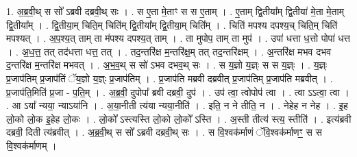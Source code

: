 \documentclass[17pt]{extarticle}
\begin{document}
1. अ॒ब्र॒वी॒थ् स सो᳚ ऽब्रवी दब्रवी॒थ् सः । . स ए॒ता मे॒ताꣳ स स ए॒ताम् । . ए॒ताम् द्वि॒तीया᳚म् द्वि॒तीया॑ मे॒ता मे॒ताम् द्वि॒तीया᳚म् । . द्वि॒तीया॒म् चिति॒म् चिति॑म् द्वि॒तीया᳚म् द्वि॒तीया॒म् चिति᳚म् । . चिति॑ मपश्य दपश्य॒च् चिति॒म् चिति॑ मपश्यत् । . अ॒प॒श्य॒त् ताम् ता म॑पश्य दपश्य॒त् ताम् । . ता मुपोप॒ ताम् ता मुप॑ । . उपा॑ धत्ता ध॒त्तो पोपा॑ धत्त । . अ॒ध॒त्त॒ तत् तद॑धत्ता धत्त॒ तत् । . तद॒न्तरि॑क्ष म॒न्तरि॑क्ष॒म् तत् तद॒न्तरि॑क्षम् । . अ॒न्तरि॑क्ष मभव दभव द॒न्तरि॑क्ष म॒न्तरि॑क्ष मभवत् । . अ॒भ॒व॒थ् स सो॑ ऽभव दभव॒थ् सः । . स य॒ज्ञो य॒ज्ञ्ः स स य॒ज्ञ्ः । . य॒ज्ञ्ः प्र॒जाप॑तिम् प्र॒जाप॑तिं ॅय॒ज्ञो य॒ज्ञ्ः प्र॒जाप॑तिम् । . प्र॒जाप॑ति मब्रवी दब्रवीत् प्र॒जाप॑तिम् प्र॒जाप॑ति मब्रवीत् । . प्र॒जाप॑ति॒मिति॑ प्र॒जा - प॒ति॒म् । . अ॒ब्र॒वी॒ दुपोपा᳚ ब्रवी दब्रवी॒ दुप॑ । . उप॑ त्वा॒ त्वोपोप॑ त्वा । . त्वा ऽऽत्वा॒ त्वा । . आ ऽया᳚ न्यया॒ न्याऽया॑नि । . अ॒या॒नीती त्य॑या न्यया॒नीति॑ । . इति॒ न ने तीति॒ न । . नेहेह न नेह । . इ॒ह लो॒को लो॒क इ॒हेह लो॒कः । . लो॒को᳚ ऽस्त्यस्ति लो॒को लो॒को᳚ ऽस्ति । . अ॒स्ती तीत्य॑ स्त्य॒ स्तीति॑ । . इत्य॑ब्रवी दब्रवी॒ दिती त्य॑ब्रवीत् । . अ॒ब्र॒वी॒थ् स सो᳚ ऽब्रवी दब्रवी॒थ् सः । . स वि॒श्वक॑र्माणं ॅवि॒श्वक॑र्माणꣳ॒॒ स स वि॒श्वक॑र्माणम् । \newline
\end{document}
